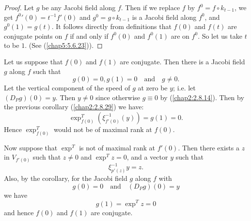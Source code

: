 \begin{proof}
Let $g$ be any Jacobi field along $f$. Then if we replace $f$ by
$f^{0}=f\circ k_{t-1}$, we get ${f^{0}}'(0)=t^{-1}f'(0)$ and
$g^{0}=g\circ k_{t-1}$ is a Jacobi field along $f^{0}$, and
$g^{0}(1)=g(t)$. It follows directly from definitions that $f(0)$ and
$f(t)$ are conjugate points on $f$ if and only if $f^{0}(0)$ and
$f^{0}(1)$ are on $f^{0}$. So let us take $t$ to be $1$. (See
(\ref{chap5:5.6.23})). 
\end{proof}

Let us suppose that $f(0)$ and $f(1)$ are conjugate. Then there is a
Jacobi field $g$ along $f$ such that
$$
g(0)=0, g(1)=0\quad\text{and}\quad g\neq 0.
$$
Let the vertical component of the speed of $g$ at zero be $y$;
i.e. let $(D_{P}g)(0)=y$. Then $y\neq 0$ since otherwise $g\equiv 0$
by (\ref{chap2:2.8.14}). Then by the previous corollary (\ref{chap2:2.8.29})
we have:
$$
\exp^{T}_{f(0)}(\xi^{-1}_{f'(0)}(y))=g(1)=0.
$$
Hence $\exp^{T}_{f(0)}$ would not be of maximal rank at $f(0)$.

Now suppose that $\exp^{T}$ is not of maximal rank at $f'(0)$. Then
there exists a $z$ in $V_{f'(0)}$ such that $z\neq 0$ and $\exp^{T}
z=0$, and a vector $y$ such that
$$
\xi^{-1}_{p'(z)}y=z.
$$
Also, by the corollary, for the Jacobi field $g$ along $f$ with
$$
g(0)=0\quad\text{and}\quad (D_{P}g)(0)=y
$$
we have
$$
g(1)=\exp^{T}z=0
$$ 
and hence $f(0)$ and $f(1)$ are conjugate.

